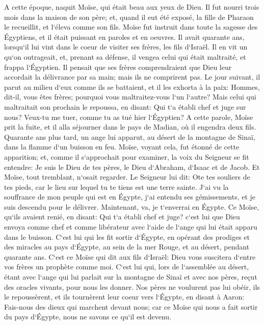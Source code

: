 \verse A cette époque, naquit Moïse, qui était beau aux yeux de Dieu. Il fut nourri trois mois dans la maison de son père; 
\verse et, quand il eut été exposé, la fille de Pharaon le recueillit, et l`éleva comme son fils. 
\verse Moïse fut instruit dans toute la sagesse des Égyptiens, et il était puissant en paroles et en oeuvres. 
\verse Il avait quarante ans, lorsqu`il lui vint dans le coeur de visiter ses frères, les fils d`Israël. 
\verse Il en vit un qu`on outrageait, et, prenant sa défense, il vengea celui qui était maltraité, et frappa l`Égyptien. 
\verse Il pensait que ses frères comprendraient que Dieu leur accordait la délivrance par sa main; mais ils ne comprirent pas. 
\verse Le jour suivant, il parut au milieu d`eux comme ils se battaient, et il les exhorta à la paix: Hommes, dit-il, vous êtes frères; pourquoi vous maltraitez-vous l`un l`autre? 
\verse Mais celui qui maltraitait son prochain le repoussa, en disant: Qui t`a établi chef et juge sur nous? 
\verse Veux-tu me tuer, comme tu as tué hier l`Égyptien? 
\verse A cette parole, Moïse prit la fuite, et il alla séjourner dans le pays de Madian, où il engendra deux fils. 
\verse Quarante ans plus tard, un ange lui apparut, au désert de la montagne de Sinaï, dans la flamme d`un buisson en feu. 
\verse Moïse, voyant cela, fut étonné de cette apparition; et, comme il s`approchait pour examiner, la voix du Seigneur se fit entendre: 
\verse Je suis le Dieu de tes pères, le Dieu d`Abraham, d`Isaac et de Jacob. Et Moïse, tout tremblant, n`osait regarder. 
\verse Le Seigneur lui dit: Ote tes souliers de tes pieds, car le lieu sur lequel tu te tiens est une terre sainte. 
\verse J`ai vu la souffrance de mon peuple qui est en Égypte, j`ai entendu ses gémissements, et je suis descendu pour le délivrer. Maintenant, va, je t`enverrai en Égypte. 
\verse Ce Moïse, qu`ils avaient renié, en disant: Qui t`a établi chef et juge? c`est lui que Dieu envoya comme chef et comme libérateur avec l`aide de l`ange qui lui était apparu dans le buisson. 
\verse C`est lui qui les fit sortir d`Égypte, en opérant des prodiges et des miracles au pays d`Égypte, au sein de la mer Rouge, et au désert, pendant quarante ans. 
\verse C`est ce Moïse qui dit aux fils d`Israël: Dieu vous suscitera d`entre vos frères un prophète comme moi. 
\verse C`est lui qui, lors de l`assemblée au désert, étant avec l`ange qui lui parlait sur la montagne de Sinaï et avec nos pères, reçut des oracles vivants, pour nous les donner. 
\verse Nos pères ne voulurent pas lui obéir, ils le repoussèrent, et ils tournèrent leur coeur vers l`Égypte, 
\verse en disant à Aaron: Fais-nous des dieux qui marchent devant nous; car ce Moïse qui nous a fait sortir du pays d`Égypte, nous ne savons ce qu`il est devenu. 
